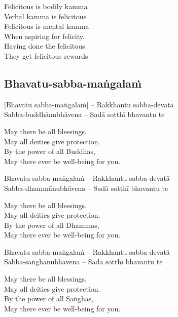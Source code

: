 \begin{english}
  Felicitous is bodily kamma\\
  Verbal kamma is felicitous\\
  Felicitous is mental kamma\\
  When aspiring for felicity.\\
  Having done the felicitous\\
  They get felicitous rewards
\end{english}

\suttaRef{[AN 3.155]}

\subsection{Bhavatu-sabba-maṅgalaṁ}
\label{bhavatu-sabba-mangalam}
[Bhavatu sabba-maṅgalaṁ] – Rakkhantu sabba-devatā\\
Sabba-buddhānubhāvena – Sadā sotthī bhavantu te

\begin{english}
  May there be all blessings.\\
  May all deities give protection.\\
  By the power of all Buddhas,\\
  May there ever be well-being for you.
\end{english}

Bhavatu sabba-maṅgalaṁ – Rakkhantu sabba-devatā\\
Sabba-dhammānubhāvena – Sadā sotthī bhavantu te

\begin{english}
  May there be all blessings.\\
  May all deities give protection.\\
  By the power of all Dhammas,\\
  May there ever be well-being for you.
\end{english}

Bhavatu sabba-maṅgalaṁ – Rakkhantu sabba-devatā\\
Sabba-saṅghānubhāvena – Sadā sotthī bhavantu te

\begin{english}
  May there be all blessings.\\
  May all deities give protection.\\
  By the power of all Saṅghas,\\
  May there ever be well-being for you.
\end{english}

\suttaRef{[Trad]}
